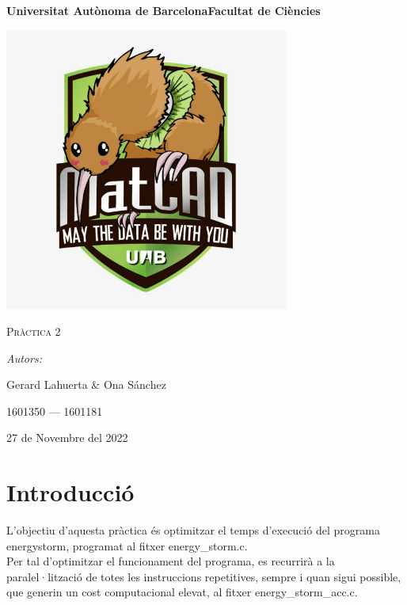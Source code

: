 \documentclass[a4paper, 11pt]{article}
\begin{document}
\begin{titlepage}
    \centering
    {\bfseries\LARGE \hspace{1.9em} Universitat Autònoma de Barcelona\newline Facultat de Ciències\par}
    \vspace{2cm}
    {\hspace{-1em}\includegraphics[width=0.7\textwidth]{MatCAD3.jpg}\par}
    \vspace{1cm}
    {\scshape\Huge Pràctica 2\par} 
    \vspace{1cm}
    {\Large \itshape Autors: \par}
    {\Large \hspace{-1.75em} Gerard Lahuerta \& Ona Sánchez \par}
    {\Large 1601350 --- 1601181 \par}
    \vspace{1cm}
    {\Large 27 de Novembre del 2022\par}
\end{titlepage}

\justifying

\newpage
\section{Introducció}
L'objectiu d'aquesta pràctica és optimitzar el temps d'execució del programa \textcolor{frenchblue}{energystorm}, programat al fitxer \textcolor{darkpastelgreen}{energy\_storm.c}. \\
Per tal d'optimitzar el funcionament del programa, es recurrirà a la paralel·lització de totes les instruccions repetitives, sempre i quan sigui possible, que generin un cost computacional elevat, al fitxer \textcolor{darkpastelgreen}{energy\_storm\_acc.c}. \\
\end{document}
